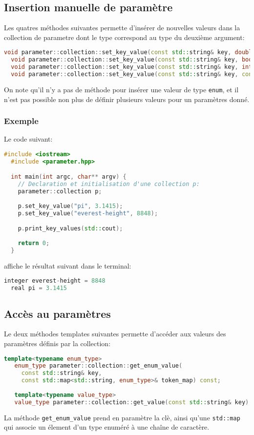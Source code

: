 \subsection{Insertion manuelle de param\`etre}
Les quatres m\'ethodes suivantes permette d'ins\'erer de nouvelles
valeurs dans la collection de parametre dont le type correspond au
type du deuxi\`eme argument:
\begin{lstlisting}[language=c++,frame=single,basicstyle=\ttfamily\footnotesize]
  void parameter::collection::set_key_value(const std::string& key, double value);
  void parameter::collection::set_key_value(const std::string& key, bool value);
  void parameter::collection::set_key_value(const std::string& key, int value);
  void parameter::collection::set_key_value(const std::string& key, const std::string& value);
\end{lstlisting}
On note qu'il n'y a pas de m\'ethode pour ins\'erer une valeur de type
\texttt{enum}, et il n'est pas possible non plus de d\'efinir
plusieurs valeurs pour un param\`etres donn\'e.

\subsubsection{Exemple}
Le code suivant:
\begin{lstlisting}[language=c++,frame=single,basicstyle=\ttfamily\footnotesize]
  #include <iostream>
  #include <parameter.hpp>

  int main(int argc, char** argv) {
    // Declaration et initialisation d'une collection p:
    parameter::collection p;
    
    p.set_key_value("pi", 3.1415);
    p.set_key_value("everest-height", 8848);

    p.print_key_values(std::cout);
    
    return 0;
  }
\end{lstlisting}
affiche le r\'esultat suivant dans le terminal:
\begin{lstlisting}[language=c++,frame=single,basicstyle=\ttfamily\footnotesize]
  integer everest-height = 8848
  real pi = 3.1415
\end{lstlisting}



\subsection{Acc\`es au param\`etres}
Le deux m\'ethodes templates suivantes permette d'acc\'eder aux valeurs des
param\`etres d\'efinis par la collection:
\begin{lstlisting}[language=c++,frame=single,basicstyle=\ttfamily\footnotesize]
   template<typename enum_type>
   enum_type parameter::collection::get_enum_value(
     const std::string& key,
     const std::map<std::string, enum_type>& token_map) const;
     
   template<typename value_type>
   value_type parameter::collection::get_value(const std::string& key) const;
\end{lstlisting}
La m\'ethode \texttt{get_enum_value} prend en param\`etre la cl\`e,
ainsi qu'une \texttt{std::map} qui associe un \'element d'un type
enum\'er\'e \`a une cha\^ine de caract\`ere.

